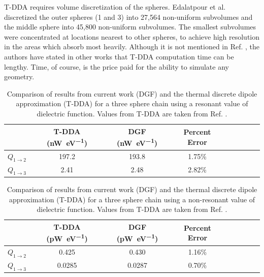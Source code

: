 T-DDA requires volume discretization of the spheres. Edalatpour et al. discretized the outer spheres (1 and 3) into 27,564 non-uniform subvolumes and the middle sphere into 45,800 non-uniform subvolumes. The smallest subvolumes were concentrated at locations nearest to other spheres, to achieve high resolution in the areas which absorb most heavily. Although it is not mentioned in Ref. , the authors have stated in other works that T-DDA computation time can be lengthy.\cite{Edalatpour2016} Time, of course, is the price paid for the ability to simulate any geometry.

\begin{table}
	\caption{Comparison of results from current work (DGF) and the thermal discrete dipole approximation (T-DDA) for a three sphere chain using a resonant value of dielectric function. Values from T-DDA are taken from Ref. .}
	\begin{center}
		\renewcommand{\arraystretch}{1.15}
		\setlength{\tabcolsep}{0.10cm}
		\begin{tabular}{ccccccccc}
			\hline 
			\multicolumn{1}{c}{} &
			\multicolumn{1}{c}{T-DDA (\si{\nano\watt\per\electronvolt})} & 
			\multicolumn{1}{c}{DGF  (\si{\nano\watt\per\electronvolt})} &
			\multicolumn{1}{c}{Percent Error} \\
			\hline
			$Q_{1 \rightarrow 2}$ & 197.2 & 193.8 & 1.75\% \\
			$Q_{1 \rightarrow 3}$ & 2.41 & 2.48 & 2.82\% \\
			\hline
		\end{tabular} 
	\end{center}
\label{tab:ThreeSphereResonant}
\end{table}

\begin{table}
	\caption{Comparison of results from current work (DGF) and the thermal discrete dipole approximation (T-DDA) for a three sphere chain using a non-resonant value of dielectric function. Values from T-DDA are taken from Ref. .}
	\begin{center}
		\renewcommand{\arraystretch}{1.15}
		\setlength{\tabcolsep}{0.10cm}
		\begin{tabular}{ccccccccc}
			\hline 
			\multicolumn{1}{c}{} &
			\multicolumn{1}{c}{T-DDA  (\si{\pico\watt\per\electronvolt})} & 
			\multicolumn{1}{c}{DGF  (\si{\pico\watt\per\electronvolt})} &
			\multicolumn{1}{c}{Percent Error} \\
			\hline
			$Q_{1 \rightarrow 2}$ & 0.425 &  0.430 & 1.16\% \\
			$Q_{1 \rightarrow 3}$ & 0.0285 & 0.0287 & 0.70\% \\
			\hline
		\end{tabular} 
	\end{center}
\label{tab:ThreeSphereNonResonant}
\end{table}


